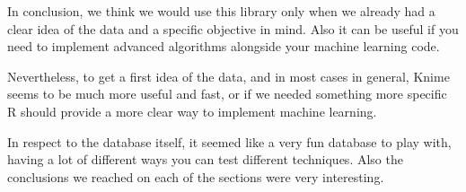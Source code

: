\documentclass[12pt]{report}
\begin{document}
In conclusion, we think we would use this library only when we already had a clear idea of the data and a specific objective in mind. Also it can be useful if you need to implement advanced algorithms alongside your machine learning code.

Nevertheless, to get a first idea of the data, and in most cases in general, Knime seems to be much more useful and fast, or if we needed something more specific R should provide a more clear way to implement machine learning.

In respect to the database itself, it seemed like a very fun database to play with, having a lot of different ways you can test different techniques. Also the conclusions we reached on each of the sections were very interesting.
\end{document}
